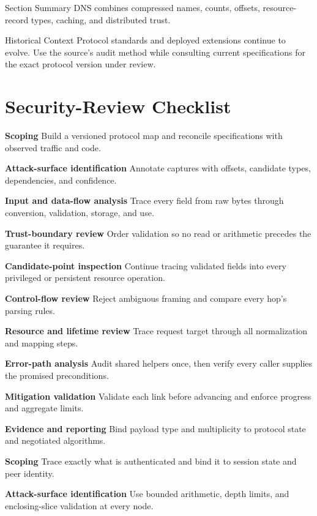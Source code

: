 \documentclass[11pt,letterpaper]{article}
\begin{document}
\begin{CornellSummaryBox}{Section Summary}
DNS combines compressed names, counts, offsets, resource-record types, caching, and distributed trust.
\end{CornellSummaryBox}
\begin{CornellLegacyBox}{Historical Context}
Protocol standards and deployed extensions continue to evolve. Use the source's audit method while consulting current specifications for the exact protocol version under review.
\end{CornellLegacyBox}
\section{Security-Review Checklist}
\begin{CornellChecklist}
\item \textbf{Scoping}
Build a versioned protocol map and reconcile specifications with observed traffic and code.
\item \textbf{Attack-surface identification}
Annotate captures with offsets, candidate types, dependencies, and confidence.
\item \textbf{Input and data-flow analysis}
Trace every field from raw bytes through conversion, validation, storage, and use.
\item \textbf{Trust-boundary review}
Order validation so no read or arithmetic precedes the guarantee it requires.
\item \textbf{Candidate-point inspection}
Continue tracing validated fields into every privileged or persistent resource operation.
\item \textbf{Control-flow review}
Reject ambiguous framing and compare every hop's parsing rules.
\item \textbf{Resource and lifetime review}
Trace request target through all normalization and mapping steps.
\item \textbf{Error-path analysis}
Audit shared helpers once, then verify every caller supplies the promised preconditions.
\item \textbf{Mitigation validation}
Validate each link before advancing and enforce progress and aggregate limits.
\item \textbf{Evidence and reporting}
Bind payload type and multiplicity to protocol state and negotiated algorithms.
\item \textbf{Scoping}
Trace exactly what is authenticated and bind it to session state and peer identity.
\item \textbf{Attack-surface identification}
Use bounded arithmetic, depth limits, and enclosing-slice validation at every node.
\end{CornellChecklist}
\end{document}
